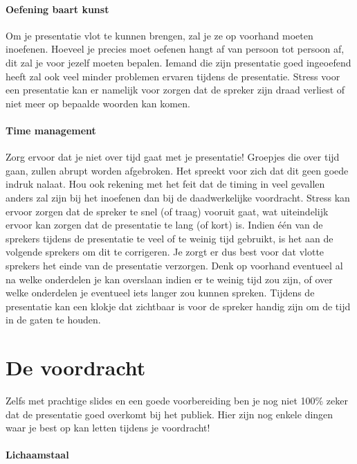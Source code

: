 \documentclass[a4paper]{article}
\begin{document}
\paragraph{Oefening baart kunst}

Om je presentatie vlot te kunnen brengen, zal je ze op voorhand moeten inoefenen.
Hoeveel je precies moet oefenen hangt af van persoon tot persoon af, dit zal je voor jezelf moeten bepalen.
Iemand die zijn presentatie goed ingeoefend heeft zal ook veel minder problemen ervaren tijdens de presentatie.
Stress voor een presentatie kan er namelijk voor zorgen dat de spreker zijn draad verliest of niet meer op bepaalde woorden kan komen.


\paragraph{Time management}

Zorg ervoor dat je niet over tijd gaat met je presentatie!
Groepjes die over tijd gaan, zullen abrupt worden afgebroken.
Het spreekt voor zich dat dit geen goede indruk nalaat.
Hou ook rekening met het feit dat de timing in veel gevallen anders zal zijn bij het inoefenen dan bij de daadwerkelijke voordracht.
Stress kan ervoor zorgen dat de spreker te snel (of traag) vooruit gaat, wat uiteindelijk ervoor kan zorgen dat de presentatie te lang (of kort) is.
Indien \'e\'en van de sprekers tijdens de presentatie te veel of te weinig tijd gebruikt, is het aan de volgende sprekers om dit te corrigeren.
Je zorgt er dus best voor dat vlotte sprekers het einde van de presentatie verzorgen.
Denk op voorhand eventueel al na welke onderdelen je kan overslaan indien er te weinig tijd zou zijn, of over welke onderdelen je eventueel iets langer zou kunnen spreken.
Tijdens de presentatie kan een klokje dat zichtbaar is voor de spreker handig zijn om de tijd in de gaten te houden.


\section{De voordracht}

Zelfs met prachtige slides en een goede voorbereiding ben je nog niet 100\% zeker dat de presentatie goed overkomt bij het publiek.
Hier zijn nog enkele dingen waar je best op kan letten tijdens je voordracht!


\paragraph{Lichaamstaal}
\end{document}
